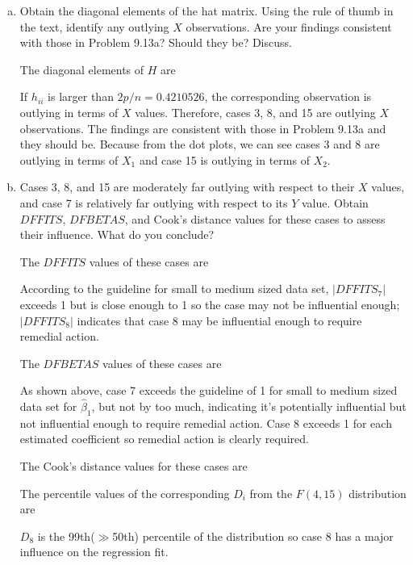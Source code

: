 \documentclass[10pt]{report}
\newcommand{\abs}[1] {\left| #1 \right|}
\begin{document}
\begin{enumerate}[a.]
	\item 
	Obtain the diagonal elements of the hat matrix. Using the rule of thumb in the text, identify any outlying $X$ observations. Are your findings consistent with those in Problem 9.13a? Should they be? Discuss.
	
	The diagonal elements of $H$ are %
	
	If $h_{ii}$ is larger than $2p/n = 0.4210526$, the corresponding observation is outlying in terms of $X$ values. Therefore, cases 3, 8, and 15 are outlying $X$ observations. The findings are consistent with those in Problem 9.13a and they should be. Because from the dot plots, we can see cases 3 and 8 are outlying in terms of $X_1$ and case 15 is outlying in terms of $X_2$.
	
	\item 
	Cases 3, 8, and 15 are moderately far outlying with respect to their $X$ values, and case 7 is relatively far outlying with respect to its $Y$ value. Obtain $DFFITS$, $DFBETAS$, and Cook's distance values for these cases to assess their influence. What do you conclude?
	
	The $DFFITS$ values of these cases are %
	
	According to the guideline for small to medium sized data set, $\abs{DFFITS_7}$ exceeds 1 but is close enough to 1 so the case may not be influential enough; $\abs{DFFITS_8}$ indicates that case 8 may be influential enough to require remedial action.
	
	The $DFBETAS$ values of these cases are %
	
	As shown above, case 7 exceeds the guideline of 1 for small to medium sized data set for $\hat{\beta}_1$, but not by too much, indicating it's potentially influential but not influential enough to require remedial action. Case 8 exceeds 1 for each estimated coefficient so remedial action is clearly required.
	
	The Cook's distance values for these cases are %
	
	The percentile values of the corresponding $D_i$ from the $F(4, 15)$ distribution are %
	
	$D_8$ is the 99th($\gg$50th) percentile of the distribution so case 8 has a major influence on the regression fit.
\end{enumerate}
\end{document}
